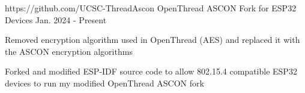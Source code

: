 
\begin{cventries}
  \cventry
    {https://github.com/UCSC-ThreadAscon} %
    {OpenThread ASCON Fork for ESP32 Devices} %
    {} %
    {Jan. 2024 - Present} %
    {
      \begin{cvitems} %
        \item{Removed encryption algorithm used in OpenThread (AES) and replaced it with the ASCON
              encryption algorithms}
        \item{Forked and modified ESP-IDF source code to allow 802.15.4 compatible ESP32 devices to run my
              modified OpenThread ASCON fork}
      \end{cvitems}
    }
\end{cventries}